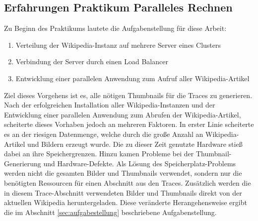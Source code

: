 \subsection{Erfahrungen Praktikum Paralleles Rechnen}
\label{sec:erfahrungen}

Zu Beginn des Praktikums lautete die Aufgabenstellung für diese Arbeit:
\begin{enumerate}
\item Verteilung der Wikipedia-Instanz auf mehrere Server eines Clusters
\item Verbindung der Server durch einen Load Balancer
\item Entwicklung einer parallelen Anwendung zum Aufruf aller Wikipedia-Artikel
\end{enumerate}
Ziel dieses Vorgehens ist es, alle nötigen Thumbnails für die Traces zu generieren. Nach der erfolgreichen Installation aller Wikipedia-Instanzen und der Entwicklung einer parallelen Anwendung zum Abrufen der Wikipedia-Artikel, scheiterte dieses Vorhaben jedoch an mehreren Faktoren. In erster Linie scheiterte es an der riesigen Datenmenge, welche durch die große Anzahl an Wikipedia-Artikel und Bildern erzeugt wurde. Die zu dieser Zeit genutzte Hardware stieß dabei an ihre Speichergrenzen. Hinzu kamen Probleme bei der Thumbnail-Generierung und Hardware-Defekte. Als Lösung des Speicherplatz-Problems werden nicht die gesamten Bilder und Thumbnails verwendet, sondern nur die benötigten Ressourcen für einen Abschnitt aus den Traces. Zusätzlich werden die in diesem Trace-Abschnitt verwendeten Bilder und Thumbnails direkt von der aktuellen Wikipedia heruntergeladen. Diese veränderte Herangehensweise ergibt die im Abschnitt \ref{sec:aufgabestellung} beschriebene Aufgabenstellung.


